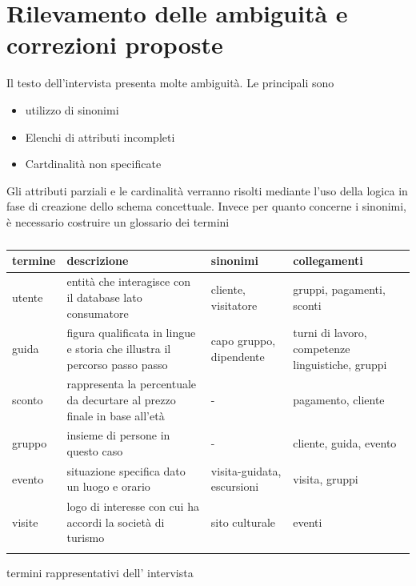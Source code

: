 \documentclass[a4paper,12pt]{report}
\begin{document}
\section{Rilevamento delle ambiguità e correzioni proposte}
Il testo dell'intervista presenta molte ambiguità. Le principali sono
\begin{itemize}
	\item utilizzo di sinonimi
	\item Elenchi di attributi incompleti
	\item Cartdinalità non specificate
\end{itemize}

Gli attributi parziali e le cardinalità verranno risolti mediante l'uso della logica in fase di creazione dello schema concettuale.
Invece per quanto concerne i sinonimi, è necessario costruire un glossario dei termini


\begin{table}[H]
	\begin{center}
		\begin{tabularx}{\textwidth}{|>{\centering\arraybackslash}X|>{\centering\arraybackslash}X|>{\centering\arraybackslash}X|>{\centering\arraybackslash}X|}
			\hline
			\rowcolor{red} termine & descrizione                                                                & sinonimi                   & collegamenti                                     \\
			\hline
			utente                 & entità che interagisce con il database lato consumatore                    & cliente, visitatore        & gruppi, pagamenti, sconti                        \\
			\hline
			guida                  & figura qualificata in lingue e storia che illustra il percorso passo passo & capo gruppo, dipendente    & turni di lavoro, competenze linguistiche, gruppi \\
			\hline
			sconto                 & rappresenta la percentuale da decurtare al prezzo finale in base all'età   & -                          & pagamento, cliente                               \\
			\hline
			gruppo                 & insieme di persone in questo caso                                          & -                          & cliente, guida, evento                           \\
			\hline
			evento                 & situazione specifica dato un luogo e orario                                & visita-guidata, escursioni & visita, gruppi                                   \\
			\hline
			visite                 & logo di interesse con cui ha accordi la società di turismo                 & sito culturale             & eventi                                           \\
			\hlinee
		\end{tabularx}
		\caption{\label{glossario:termini}} termini rappresentativi dell' intervista
	\end{center}
\end{table}
\end{document}
